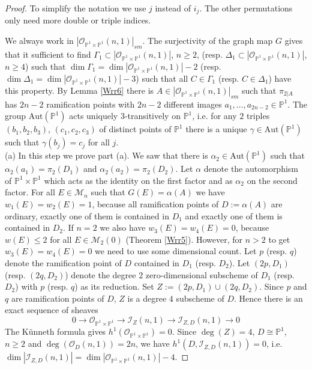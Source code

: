 \documentclass[10pt,a4paper]{amsart}
\theoremstyle{plain}
\theoremstyle{definition}
\theoremstyle{remark}
\begin{document}
\begin{proof}
To simplify the notation we use $j$ instead of $i_j$. The other permutations only need more double or triple indices.

We always work in $|\mathcal O_{\mathbb P^1\times \mathbb P^1}(n,1)|_{sm}$. The surjectivity of the graph map $G$ \cite[Th. 5.2.2]{BH} gives that it sufficient to find
$\Gamma_1\subset |\mathcal O_{\mathbb P^1\times \mathbb P^1}(n,1)|$, $n\ge 2$, (resp. $\Delta_1\subset |\mathcal O_{\mathbb P^1\times \mathbb P^1}(n,1)|$, $n\ge 4$) such that
$\dim \Gamma _1 =\dim |\mathcal O_{\mathbb P^1\times \mathbb P^1}(n,1)| -2$ (resp. $\dim \Delta _1 =\dim |\mathcal O_{\mathbb P^1\times \mathbb P^1}(n,1)| -3$) such that all $C\in \Gamma_1$ (resp. $C\in \Delta_1$) have this
 property.
By Lemma \ref{Wrr6} there is $A\in |\mathcal O_{\mathbb P^1\times \mathbb P^1}(n,1)|_{sm}$ such that $\pi_{2|A}$ has $2n-2$ ramification points with $2n-2$ different images $a_1,\dots ,a_{2n-2}\in \mathbb P^1$. The group $\mathrm{Aut}(\mathbb P^1)$ acts uniquely 3-transitively on $\mathbb P^1$, i.e. for any $2$ triples $(b_1,b_2,b_3)$, $(c_1,c_2,c_3)$ of distinct points of $\mathbb P^1$ there is a unique $\gamma\in \mathrm{Aut}(\mathbb P^1)$ such that $\gamma(b_j)=c_j$ for all $j$.\\

 (a) In this step we prove part (a).  We saw that
there is $\alpha_2 \in \mathrm{Aut}(\mathbb P^1)$ such that $\alpha_2(a_1) =\pi_2(D_1)$ and $\alpha_2(a_2)= \pi_2(D_2)$. Let $\alpha$ denote the automorphism of $\mathbb P^1\times \mathbb P^1$ which acts as the identity 
on the first factor and as $\alpha_2$ on the second factor. For all $E\in \mathcal M_n$ such that $G(E)=\alpha(A)$
we have $w_1(E)=w_2(E)=1$, because all ramification points of $D:= \alpha(A)$ are ordinary, 
exactly one of  them is contained in $D_1$ and exactly one of them is contained in $D_2$. 
If $n=2$ we also have $w_3(E)=w_4(E)=0$, because $w(E)\le 2$ for all $E\in \mathcal M_{2}(0)$ 
(Theorem \ref{Wrr5}). However, for $n>2$ to get $w_3(E)=w_4(E)=0$ we need to use some dimensional count.
Let $p$ (resp. $q$) denote the ramification point of $D$ contained in $D_1$ (resp. $D_2$). Let $(2p,D_1)$ (resp. $(2q,D_2)$) denote the degree $2$ zero-dimensional subscheme of $D_1$ (resp. $D_2$) with $p$ (resp. $q$) as its reduction. Set $Z:= (2p,D_1)\cup (2q,D_2)$. Since $p$ and $q$ are ramification points of $D$, $Z$ is a degree $4$ subscheme of $D$. Hence there is an exact sequence of sheaves
\begin{equation}\label{eqb1}
0\to \mathcal O_{\mathbb P^1\times \mathbb P^1}\to \mathcal I_Z(n,1)\to \mathcal I_{Z,D}(n,1)\to 0
\end{equation}
 The K\"{u}nneth formula gives $h^1(\mathcal O_{\mathbb P^1\times \mathbb P^1})=0$. Since $\deg(Z)=4$, $D\cong \mathbb P^1$, $n\ge 2$ and $\deg(\mathcal O_D(n,1)) =2n$, we have
$h^1(D,\mathcal I_{Z,D}(n,1)) =0$, i.e. $\dim |\mathcal I_{Z,D}(n,1)| =\dim |\mathcal O_{\mathbb P^1\times \mathbb P^1}(n,1)|-4$. 


\end{proof}
\end{document}
